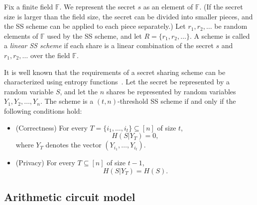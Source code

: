 \documentclass[11pt]{article}
\newcommand{\cond}{|}
\begin{document}
Fix a finite field $\mathbb{F}$. We represent the secret $s$ as an element of $\mathbb{F}$. (If the secret size is larger than the field size, the secret can be divided into smaller pieces, and the SS scheme can be applied to each piece separately.) Let $r_1, r_2, \dots$ be random elements of $\mathbb{F}$ used by the SS scheme, and let $R = \{r_1, r_2, \ldots\}$. A scheme is called a \emph{linear SS scheme} if each share is a linear combination of the secret $s$ and $r_1, r_2, \ldots$ over the field $\mathbb{F}$.


It is well known that the requirements of a secret sharing scheme can be characterized using entropy functions~\cite{beimel2011secret}. Let the secret be represented by a random variable $S$, and let the $n$ shares be represented by random variables $Y_1, Y_2, \ldots, Y_n$. The scheme is a $(t,n)$-threshold SS scheme if and only if the following conditions hold:
\begin{itemize}
	\item (Correctness) For every $T = \{i_1, \ldots, i_t\} \subseteq [n]$ of size $t$,
	\begin{equation}
	\label{equ:h_cor}
	H(S \cond Y_T) = 0,
	\end{equation}
	where $Y_T$ denotes the vector $(Y_{i_1}, \ldots, Y_{i_t})$.
	\item (Privacy) For every $T \subseteq [n]$ of size $t-1$,
	\begin{equation}
	\label{equ:h_pri}
	H(S \cond Y_T) = H(S).
	\end{equation}
\end{itemize}


\subsection{Arithmetic circuit model}
\end{document}
